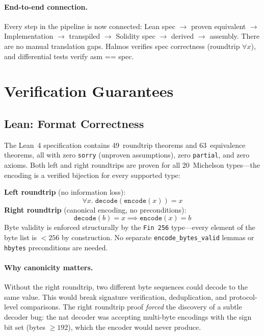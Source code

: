 \documentclass[11pt,a4paper]{article}
\begin{document}
\paragraph{End-to-end connection.}
Every step in the pipeline is now connected: Lean spec $\to$ proven equivalent
$\to$ Implementation $\to$ transpiled $\to$ Solidity spec $\to$ derived $\to$
assembly. There are no manual translation gaps. Halmos verifies spec correctness
(roundtrip $\forall x$), and differential tests verify asm == spec.

\section{Verification Guarantees}

\subsection{Lean: Format Correctness}

The Lean~4 specification contains 49~roundtrip theorems and 63~equivalence
theorems, all with zero \texttt{sorry} (unproven assumptions), zero \texttt{partial},
and zero axioms.  Both left and right roundtrips are proven for all 20~Michelson
types---the encoding is a verified bijection for every supported type:

\begin{tcolorbox}[colback=leanblue!5, colframe=leanblue, title=\sffamily Lean-proven properties]
\textbf{Left roundtrip} (no information loss):
\[ \forall x.\; \texttt{decode}(\texttt{encode}(x)) = x \]
\textbf{Right roundtrip} (canonical encoding, no preconditions):
\[ \texttt{decode}(b) = x \implies \texttt{encode}(x) = b \]
Byte validity is enforced structurally by the \texttt{Fin 256} type---every
element of the byte list is $< 256$ by construction. No separate
\texttt{encode\_bytes\_valid} lemmas or \texttt{hbytes} preconditions are needed.
\end{tcolorbox}

\paragraph{Why canonicity matters.} Without the right roundtrip, two different
byte sequences could decode to the same value. This would break signature
verification, deduplication, and protocol-level comparisons. The right roundtrip
proof \emph{forced} the discovery of a subtle decoder bug: the nat decoder was
accepting multi-byte encodings with the sign bit set (bytes $\geq 192$), which
the encoder would never produce.
\end{document}
